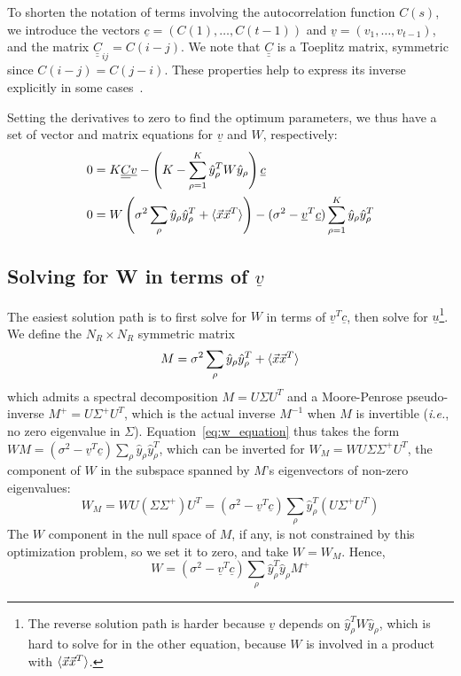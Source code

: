 \documentclass[letter, 12pt]{article}
\def\beq{ \begin{equation} }		%
\def\eeq{ \end{equation} } 			%
\def\ie{\textit{i.e.}, }
\newcommand{\dul}[1]{\underline{\underline{#1}}}
\begin{document}
To shorten the notation of terms involving the autocorrelation function $C(s)$, we introduce the vectors $\underline{c} = (C(1), \ldots, C(t-1))$ and $\underline{v} = (v_1, \ldots, v_{t-1})$, and the matrix $\dul{C}_{ij} = C(i-j)$. We note that $\dul{C}$ is a Toeplitz matrix, symmetric since $C(i-j) = C(j-i)$. These properties help to express its inverse explicitly in some cases~\cite{dow_explicit_2003}. 

Setting the derivatives to zero to find the optimum parameters, we thus have a set of vector and matrix equations for $\underline{v}$ and $W$, respectively:
\begin{align}
0 &= K \dul{C} \underline{v} - \left(K - \sum_{\rho=1}^K \hat{y}_{\rho}^T W \hat{y}_{\rho}\right) \underline{c}
	 \label{eq:v_equation} \\
0 &= W \left( \sigma^2 \sum_{\rho} \hat{y}_{\rho} \hat{y}_{\rho}^T + \braket{\vec{x} \vec{x}^T} \right) - (\sigma^2 - \underline{v}^T \underline{c}) \sum_{\rho=1}^K \hat{y}_{\rho} \hat{y}_{\rho}^T
	\label{eq:w_equation}
\end{align}

\subsection{Solving for W in terms of $\underline{v}$}
The easiest solution path is to first solve for $W$ in terms of $\underline{v}^T \underline{c}$, then solve for $\underline{u}${\protect\footnote{
The reverse solution path is harder because $\underline{v}$ depends on $\hat{y}_{\rho}^T W \hat{y}_{\rho}$, which is hard to solve for in the other equation, because $W$ is involved in a product with $\braket{\vec{x} \vec{x}^T}$. 
}}. We define the $N_R \times N_R$ symmetric matrix
\beq
M = \sigma^2 \sum_{\rho} \hat{y}_{\rho} \hat{y}_{\rho}^T + \braket{\vec{x} \vec{x}^T}
\label{eq:matrix_m}
\eeq
which admits a spectral decomposition $M = U \Sigma U^T$ and a Moore-Penrose pseudo-inverse $M^+ = U \Sigma^+ U^T$, which is the actual inverse $M^{-1}$ when $M$ is invertible (\ie no zero eigenvalue in $\Sigma$). Equation~\ref{eq:w_equation} thus takes the form $WM = (\sigma^2 - \underline{v}^T\underline{c}) \sum_{\rho} \hat{y}_{\rho} \hat{y}_{\rho}^T$, which can be inverted for $W_M = W U \Sigma \Sigma^+ U^T$, the component of $W$ in the subspace spanned by $M$'s eigenvectors of non-zero eigenvalues:
\begin{equation*}
W_M  = W U (\Sigma \Sigma^+) U^T = (\sigma^2 - \underline{v}^T \underline{c}) \sum_{\rho} \hat{y}_{\rho}^T (U \Sigma^+ U^T) 
\end{equation*}
The $W$ component in the null space of $M$, if any, is not constrained by this optimization problem, so we set it to zero, and take $W = W_M$. Hence, 
\beq
	W = (\sigma^2 - \underline{v}^T \underline{c}) \sum_{\rho} \hat{y}_{\rho}^T \hat{y}_{\rho} M^+
	\label{eq:w_in_terms_v}
\eeq
\end{document}
